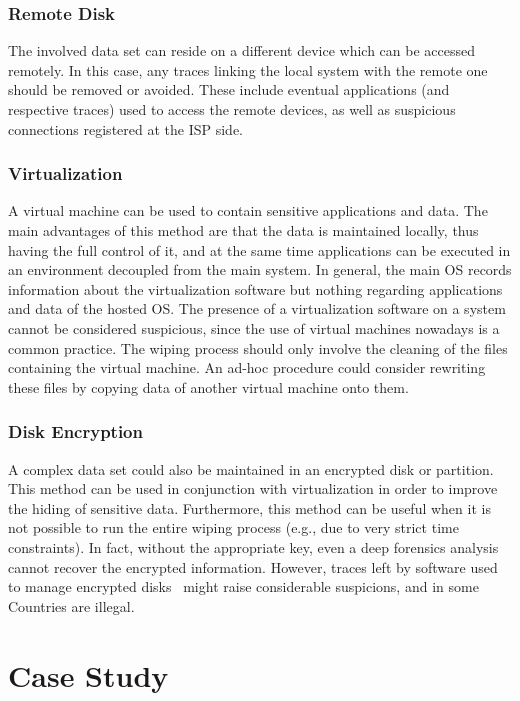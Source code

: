 \documentclass[10pt, conference, compsocconf]{IEEEtran}
\begin{document}
\subsubsection{Remote Disk}
The involved data set can reside on a different device which can be accessed remotely. In this case, any traces linking the local system with the remote one should be removed or avoided. These include eventual applications (and respective traces) used to access the remote devices, as well as suspicious connections registered at the ISP side.

\subsubsection{Virtualization}
A virtual machine can be used to contain sensitive applications and data. The main advantages of this method are that the data is maintained locally, thus having the full control of it, and at the same time applications can be executed in an environment decoupled from the main system. In general, the main OS records information about the virtualization software but nothing regarding applications and data of the hosted OS. The presence of a virtualization software on a system cannot be considered suspicious, since the use of virtual machines nowadays is a common practice.
The wiping process should only involve the cleaning of the files containing the virtual machine. An ad-hoc procedure could consider rewriting these files by copying data of another virtual machine onto them.

\subsubsection{Disk Encryption}
A complex data set could also be maintained in an encrypted disk or partition. This method can be used in conjunction with virtualization in order to improve the hiding of sensitive data. Furthermore, this method can be useful when it is not possible to run the entire wiping process (e.g., due to very strict time constraints). In fact, without the appropriate key, even a deep forensics analysis cannot recover the encrypted information. However, traces left by software used to manage encrypted disks~\cite{diskenc} might raise considerable suspicions, and in some Countries are illegal.


\section{Case Study}
\label{case}
\end{document}
